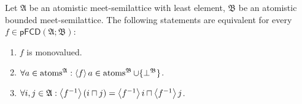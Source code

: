 \begin{thm}
Let $\mathfrak{A}$ be an atomistic meet-semilattice with least element,
$\mathfrak{B}$ be an atomistic bounded meet-semilattice. The following
statements are equivalent for every $f\in\mathsf{pFCD}(\mathfrak{A};\mathfrak{B})$:
\begin{enumerate}
\item \label{pf-thm:func-mono-def}$f$ is monovalued.
\item \label{pf-thm:func-mono-atom}$\forall a\in\operatorname{atoms}^{\mathfrak{A}}:\left\langle f\right\rangle a\in\operatorname{atoms}^{\mathfrak{B}}\cup\{\bot^{\mathfrak{B}}\}$.
\item \label{pf-thm:func-mono-intr-flt}$\forall i,j\in\mathfrak{A}:\left\langle f^{-1}\right\rangle(i\sqcap j)=\left\langle f^{-1}\right\rangle i\sqcap\left\langle f^{-1}\right\rangle j$.
\end{enumerate}
\end{thm}
